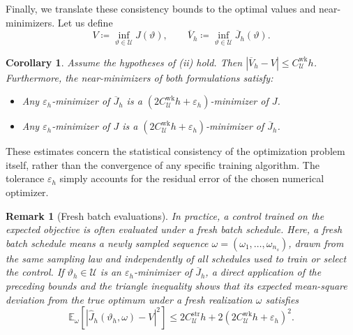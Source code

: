 \documentclass[twoside,11pt]{article}
\theoremstyle{plain}
\newtheorem{corollary}[theorem]{Corollary}
\newtheorem{remark}[theorem]{Remark}
\begin{document}

Finally, we translate these consistency bounds to the optimal values and near-minimizers. Let us define
\begin{equation*}
V \coloneqq \inf_{\vartheta\in\mathcal U}J(\vartheta), \qquad \overline V_h \coloneqq \inf_{\vartheta\in\mathcal U}\overline J_h(\vartheta).
\end{equation*}

\begin{corollary}\label{cor:optimal_values}
Assume the hypotheses of (ii) hold. Then $|\overline V_h - V| \le C_{\mathcal U}^{\mathrm{wk}}h$. Furthermore, the near-minimizers of both formulations satisfy:
\begin{itemize}
    \item Any $\varepsilon_h$-minimizer of $\overline J_h$ is a $(2C_{\mathcal U}^{\mathrm{wk}}h + \varepsilon_h)$-minimizer of $J$.
    \item Any $\varepsilon_h$-minimizer of $J$ is a $(2C_{\mathcal U}^{\mathrm{wk}}h + \varepsilon_h)$-minimizer of $\overline J_h$.
\end{itemize}
\end{corollary}

These estimates concern the statistical consistency of the optimization problem itself, rather than the convergence of any specific training algorithm. The tolerance $\varepsilon_h$ simply accounts for the residual error of the chosen numerical optimizer.

\begin{remark}[Fresh batch evaluations]\label{rem:new_realization}
In practice, a control trained on the expected objective is often evaluated
under a fresh batch schedule. Here, a fresh batch schedule means a newly
sampled sequence $\omega=(\omega_1,\ldots,\omega_{n_s})$, drawn from the
same sampling law and independently of all schedules used to train or
select the control. If $\vartheta_h \in \mathcal U$ is an $\varepsilon_h$-minimizer of $\overline J_h$, a direct application of the preceding bounds and the triangle inequality shows that its expected mean-square deviation from the true optimum under a fresh realization $\omega$ satisfies
\begin{equation*}
\mathbb E_\omega \left[ |\hat J_h(\vartheta_h, \omega) - V|^2 \right] \le 2C_{\mathcal U}^{\mathrm{str}}h + 2(2C_{\mathcal U}^{\mathrm{wk}}h + \varepsilon_h)^2.
\end{equation*}
\end{remark}
\end{document}
